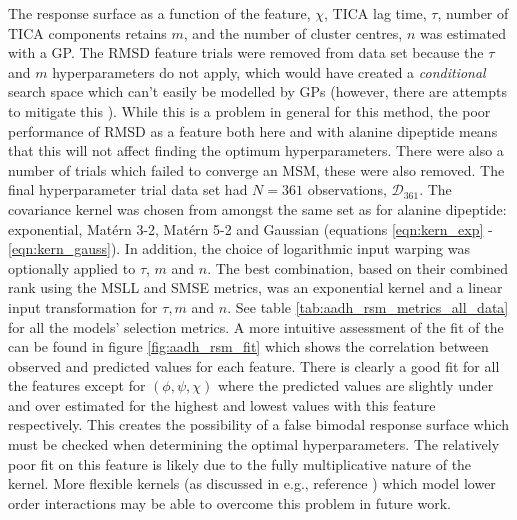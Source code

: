 The response surface as a function of the feature, $\chi$, TICA lag time, $\tau$, number of TICA components retains $m$, and the number of cluster centres, $n$ was estimated with a GP. The RMSD feature trials were removed from data set because the $\tau$ and $m$ hyperparameters do not apply, which would have created a \emph{conditional} search space \cite{bergstraAlgorithmsHyperParameterOptimizationa} which  can't easily be modelled by GPs (however, there are attempts to mitigate this \cite{swerskyRaidersLostArchitecture2014}). While this is a problem in general for this method, the poor performance of RMSD as a feature both here and with alanine dipeptide means that this will not affect finding the optimum hyperparameters. There were also a number of trials which failed to converge an MSM, these were also removed. The final hyperparameter trial data set had $N=361$ observations, $\mathcal{D}_{361}$. 
The covariance kernel was chosen from amongst the same set as for alanine dipeptide: exponential, Mat\'{e}rn 3-2, Mat\'{e}rn 5-2 and  Gaussian (equations \ref{eqn:kern_exp} - \ref{eqn:kern_gauss}). In addition, the choice of logarithmic  input warping was optionally applied to $\tau$, $m$ and $n$. The best combination, based on their combined rank using the MSLL and SMSE metrics, was an exponential kernel and a linear input transformation for $\tau, m$ and $n$. See table \ref{tab:aadh_rsm_metrics_all_data} for  all the models' selection metrics. A more intuitive assessment of the fit of the can be found in figure  \ref{fig:aadh_rsm_fit} which shows the correlation between observed and predicted values for each feature. There is clearly a good fit for all the features except for $(\phi, \psi, \chi)$ where the predicted values are slightly under and over estimated for the highest and lowest values with this feature respectively. This creates the possibility of a false bimodal response surface which must be checked when determining the optimal hyperparameters.  The relatively poor fit on this feature is likely due to the fully multiplicative nature of the kernel. More flexible kernels (as discussed in e.g., reference \cite{duvenaud2011additive}) which model lower order interactions may be able to overcome this problem in future work. 

